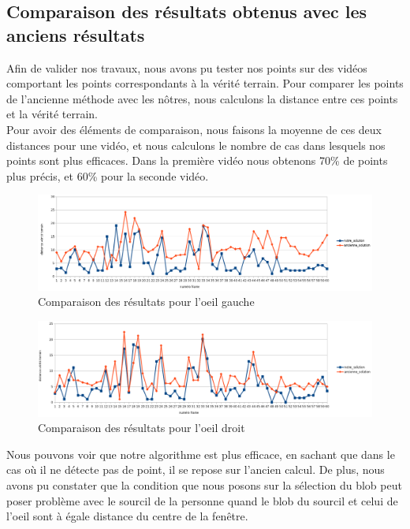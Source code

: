 \subsection{Comparaison des résultats obtenus avec les anciens résultats}
Afin de valider nos travaux, nous avons pu tester nos points sur des vidéos comportant les points correspondants à
la vérité terrain. Pour comparer les points de l'ancienne méthode avec les nôtres, nous calculons la
distance entre ces points et la vérité terrain.\\

Pour avoir des éléments de comparaison, nous faisons la moyenne de ces deux distances pour une vidéo, et nous calculons
le nombre de cas dans lesquels nos points sont plus efficaces. Dans la première vidéo nous obtenons 70\% de points plus précis, et
60\% pour la seconde vidéo.\\

\begin{figure}[H]
  \includegraphics[width=17cm]{resultat/resultat_gauche.png}
  \caption{Comparaison des résultats pour l'oeil gauche}
\end{figure}

\begin{figure}[H]
  \includegraphics[width=17cm]{resultat/resultat_droit.png}
  \caption{Comparaison des résultats pour l'oeil droit}
\end{figure}

Nous pouvons voir que notre algorithme est plus efficace, en sachant que dans le cas où il ne détecte pas de point, il se repose sur l'ancien
calcul. De plus, nous avons pu constater que la condition que nous posons sur la sélection du blob peut poser problème 
avec le sourcil de la personne quand le blob du sourcil et celui de l'oeil sont à égale distance du centre de la fenêtre.\\

